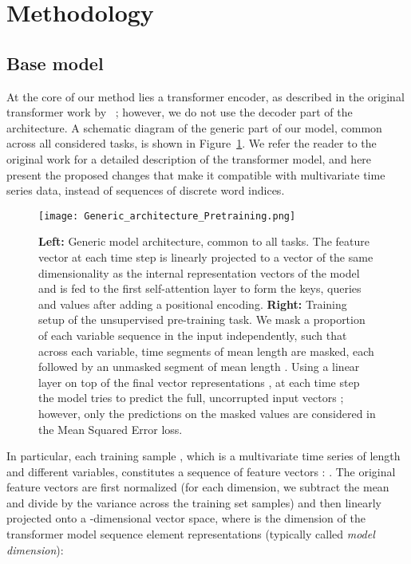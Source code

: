 \documentclass{article} \usepackage{iclr2021_conference,times}
\begin{document}
\section{Methodology}

\subsection{Base model}\label{sec:base_model}

At the core of our method lies a transformer encoder, as described in the original transformer work by ~\citet{vaswani_attention_2017}; however, we do not use the decoder part of the architecture.  A schematic diagram of the generic part of our model, common across all considered tasks, is shown in Figure~\ref{fig:generic_architecture_pretraining}. We refer the reader to the original work for a detailed description of the transformer model, and here present the proposed changes that make it compatible with multivariate time series data, instead of sequences of discrete word indices.

\begin{figure}[h]
    \centering
    \texttt{[image: Generic\_architecture\_Pretraining.png]}
    \caption{\textbf{Left:} Generic model architecture, common to all tasks. The feature vector  at each time step  is linearly projected to a vector  of the same dimensionality  as the internal representation vectors of the model and is fed to the first self-attention layer to form the keys, queries and values after adding a positional encoding. \textbf{Right:} Training setup of the unsupervised pre-training task. We mask a proportion  of each variable sequence in the input independently, such that across each variable, time segments of mean length  are masked, each followed by an unmasked segment of mean length . Using a linear layer on top of the final vector representations , at each time step the model tries to predict the full, uncorrupted input vectors ; however, only the predictions on the masked values are considered in the Mean Squared Error loss.}
    \label{fig:generic_architecture_pretraining}
\end{figure}

In particular, each training sample , which is a multivariate time series of length  and  different variables, constitutes a sequence of  feature vectors :  . The original feature vectors  are first normalized (for each dimension, we subtract the mean and divide by the variance across the training set samples) and then linearly projected onto a -dimensional vector space, where  is the dimension of the transformer model sequence element representations (typically called \textit{model dimension}):
\end{document}
